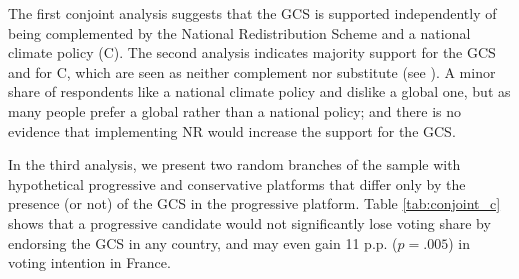 \begin{bibunit}
The first conjoint analysis suggests that the GCS is supported independently of being complemented by the National Redistribution Scheme and a national climate policy (C). %
The second analysis indicates majority support for the GCS and for C, which are seen as neither complement nor substitute (see ). A minor share of respondents like a national climate policy and dislike a global one, but as many people prefer a global rather than a national policy; and there is no evidence that implementing NR would increase the support for the GCS.


In the third analysis, we present two random branches of the sample with hypothetical progressive and conservative platforms that differ only by the presence (or not) of the GCS in the progressive platform. Table \ref{tab:conjoint_c} shows that a progressive candidate would not significantly lose voting share by endorsing the GCS in any country, and may even gain 11 p.p. ($p = .005$) in voting intention in France. %


\end{bibunit}
